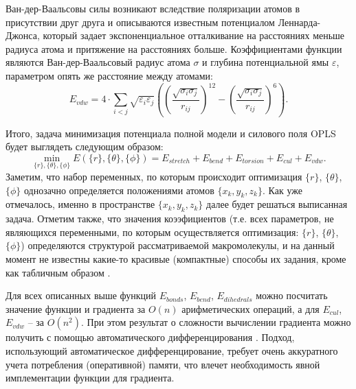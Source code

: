   Ван-дер-Ваальсовы силы возникают вследствие поляризации атомов в присутствии друг друга и описываются известным потенциалом Леннарда-Джонса, который задает экспоненциальное отталкивание на расстояниях меньше радиуса атома и притяжение на расстояниях больше.
  Коэффициентами функции являются Ван-дер-Ваальсовый радиус атома $\sigma$ и глубина потенциальной ямы $\varepsilon$, параметром опять же расстояние между атомами:
  $$
  E_{vdw} = 4 \cdot \sum_{i < j} \sqrt{\varepsilon_i \varepsilon_j} \left( \left( \frac{\sqrt{\sigma_i \sigma_j}}{r_{ij}} \right)^{12} - \left( \frac{\sqrt{\sigma_i \sigma_j}}{r_{ij}} \right)^{6} \right).
  $$

  Итого, задача минимизация потенциала полной модели и силового поля OPLS будет выглядеть следующим образом:
  $$
  \min_{\{r\},\{\theta\},\{\phi\}} {E(\{r\},\{\theta\},\{\phi\}) = E_{stretch} + E_{bend} + E_{torsion} + E_{cul} + E_{vdw}}.
  $$
  Заметим, что набор переменных, по которым происходит оптимизация $\{r\}$, $\{\theta\}$, $\{\phi\}$ однозачно определяется положениями атомов $\{x_k ,y_k ,z_k\}$. Как уже отмечалось, именно в пространстве $\{x_k ,y_k ,z_k\}$ далее будет решаться выписанная задача. Отметим также, что значения коээфициентов (т.е. всех параметров, не являющихся переменными, по которым осуществляется оптимизация: $\{r\}$, $\{\theta\}$, $\{\phi\}$) определяются структурой рассматриваемой макромолекулы, и на данный момент не известны какие-то красивые (компактные) способы их задания, кроме как табличным образом \cite{Jorgensen1996}.


  Для всех описанных выше функций $E_{bonds}$, $E_{bend}$, $E_{dihedrals}$ можно посчитать значение функции и градиента за ${O}\left( n \right)$ арифметических операций, а для $E_{cul}$, $E_{vdw}$ -- за ${O}\left( n^2 \right)$.
  При этом результат о сложности вычислении градиента можно получить с помощью автоматического дифференцирования \cite{nocedal2006sequential}. Подход, использующий автоматическое дифференцирование, требует очень аккуратного учета потребления (оперативной) памяти, что влечет необходимость явной имплементации функции для градиента.

